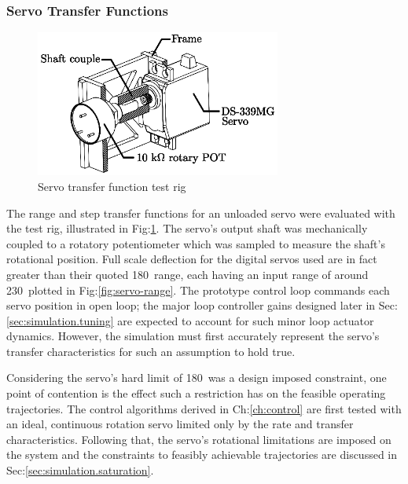 \subsubsection*{Servo Transfer Functions}
\begin{figure}[htbp]
\centering
\includegraphics[width=0.72\textwidth]{figs/servo-position}
\vspace{-6pt}
\caption{Servo transfer function test rig}
\label{fig:servo-position}
\end{figure}
The range and step transfer functions for an unloaded servo were evaluated with the test rig, illustrated in Fig:\ref{fig:servo-position}. The servo's output shaft was mechanically coupled to a rotatory potentiometer which was sampled to measure the shaft's rotational position. Full scale deflection for the digital servos used are in fact greater than their quoted 180\textdegree ~range, each having an input range of around 230\textdegree ~plotted in Fig:\ref{fig:servo-range}. The prototype control loop commands each servo position in open loop; the major loop controller gains designed later in Sec:\ref{sec:simulation.tuning} are expected to account for such minor loop actuator dynamics. However, the simulation must first accurately represent the servo's transfer characteristics for such an assumption to hold true. 
\par
Considering the servo's hard limit of 180\textdegree ~was a design imposed constraint, one point of contention is the effect such a restriction has on the feasible operating trajectories. The control algorithms derived in Ch:\ref{ch:control} are first tested with an ideal, continuous rotation servo limited only by the rate and transfer characteristics. Following that, the servo's rotational limitations are imposed on the system and the constraints to feasibly achievable trajectories are discussed in Sec:\ref{sec:simulation.saturation}.
